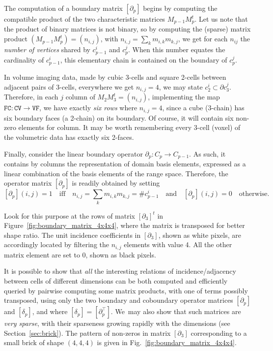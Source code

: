 The computation of a boundary matrix $[\partial_p]$ begins by computing the compatible product of the two characteristic matrices $M_{p-1}M_{p}^t$.
Let us note that the product of binary matrices is not binary, so by computing the (sparse) matrix product $(M_{p-1} M_{p}^t) = (n_{i,j})$, with $n_{i,j} = \sum_{k} m_{i,k}m_{k,j}$, we get for each $n_{ij}$ the \emph{number of vertices} shared by $c_{p-1}^i$ and $c_{p}^j$. When this number equates the cardinality of $c_{p-1}^i$, this elementary chain is contained on the boundary of $c_{p}^j$. 

In volume imaging data, made by cubic 3-cells and square 2-cells between adjacent pairs of 3-cells, everywhere we get  $n_{i,j}=4$, we may state $c_{2}^i\subset\partial c_{3}^j$. 
Therefore, in each $j$ column of $M_{2} M_{3}^t = (n_{i,j})$, implementing the map $\texttt{FC} : \texttt{CV} \to \texttt{VF}$, we have exactly \emph{six rows} where  $n_{i,j} = 4$, since a cube (3-chain) has six boundary faces (a 2-chain) on its boundary. 
Of course, it will contain six non-zero elements for column.  It may be worth remembering every 3-cell (voxel) of the volumetric data has exactly six 2-faces. 

Finally, consider the linear boundary operator $\partial_p : C_p \to C_{p-1}$. As such, it contains by columns the representation of domain basis elements, expressed as a linear combination of the basis elements of the range space. Therefore, the operator matrix $[\partial_p]$ is readily obtained by setting 
\[
[\partial_p](i,j)=1\quad\mbox{iff}\quad n_{i,j} = \sum_{k} m_{i,k}m_{k,j}=\texttt{\#}c^i_{p-1} \quad\mbox{and}\quad [\partial_p](i,j)=0 \quad\mbox{otherwise}.  
\]

Look for this purpose at the rows of matrix $[\partial_3]^t$ in Figure~\ref{fig:boundary_matrix_4x4x4}, where the matrix is  transposed for better shape ratio.
The unit incidence coefficients in $\left[\partial_3\right]$, shown as white pixels, are accordingly located by filtering the $n_{i,j}$ elements with value 4. All the other matrix element are set to 0, shown as black pixels. 

It is possible to show that \emph{all} the interesting relations of incidence/adjacency between cells of different dimensions can be both computed and efficiently queried by pairwise computing some matrix products, with one of terms possibly transposed, using only the two boundary and coboundary operator matrices $[\partial_p]$ and $[\delta_p]$, and where $[\delta_p] = [\partial_p^\top]$. We~may also show that such matrices are \emph{very sparse}, with their sparseness growing rapidly with the dimensions (see Section~\ref{sec:brick}). The pattern of non-zeros in matrix $[\partial_3]$ corresponding to a small brick of shape $(4,4,4)$ is given in Fig.~\ref{fig:boundary_matrix_4x4x4}.

